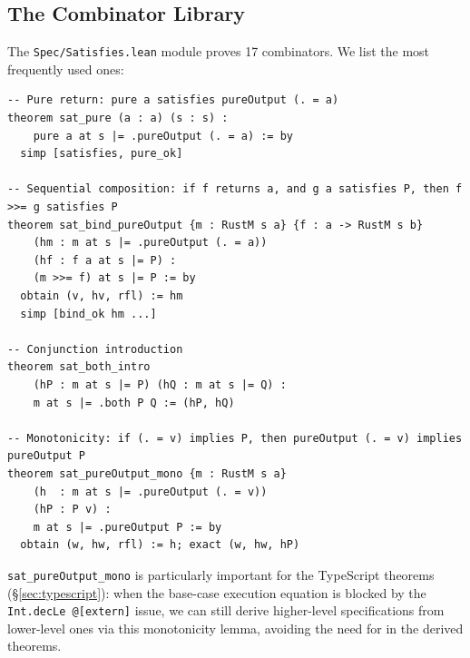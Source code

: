 \subsection{The Combinator Library}

The \texttt{Spec/Satisfies.lean} module proves 17 combinators. We list the
most frequently used ones:

\begin{lstlisting}[caption={Key ProgramSpec combinators (selection).},label={lst:combinators}]
-- Pure return: pure a satisfies pureOutput (. = a)
theorem sat_pure (a : a) (s : s) :
    pure a at s |= .pureOutput (. = a) := by
  simp [satisfies, pure_ok]

-- Sequential composition: if f returns a, and g a satisfies P, then f >>= g satisfies P
theorem sat_bind_pureOutput {m : RustM s a} {f : a -> RustM s b}
    (hm : m at s |= .pureOutput (. = a))
    (hf : f a at s |= P) :
    (m >>= f) at s |= P := by
  obtain (v, hv, rfl) := hm
  simp [bind_ok hm ...]

-- Conjunction introduction
theorem sat_both_intro
    (hP : m at s |= P) (hQ : m at s |= Q) :
    m at s |= .both P Q := (hP, hQ)

-- Monotonicity: if (. = v) implies P, then pureOutput (. = v) implies pureOutput P
theorem sat_pureOutput_mono {m : RustM s a}
    (h  : m at s |= .pureOutput (. = v))
    (hP : P v) :
    m at s |= .pureOutput P := by
  obtain (w, hw, rfl) := h; exact (w, hw, hP)
\end{lstlisting}

\texttt{sat\_pureOutput\_mono} is particularly important for the TypeScript
theorems (\S\ref{sec:typescript}): when the base-case execution equation is
blocked by the \texttt{Int.decLe @[extern]} issue, we can still derive
higher-level specifications from lower-level ones via this monotonicity lemma,
avoiding the need for \sorry in the derived theorems.

